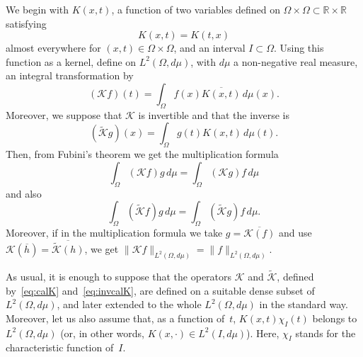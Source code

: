 \documentclass[11pt,a4paper]{amsart}
\theoremstyle{plain}
\theoremstyle{definition}
\newcommand{\R}{\mathbb{R}}
\newcommand{\calK}{\mathcal{K}}
\begin{document}
We begin with $K(x,t)$, a function of two variables defined on $\Omega
\times \Omega \subset \R\times \R$ satisfying
\begin{equation*}
  K(x,t)=K(t,x)
\end{equation*} 
almost everywhere for $(x,t) \in \Omega \times \Omega$, 
and an interval $I\subset \Omega$.
Using this function as a kernel, define on $L^{2}(\Omega,d\mu)$, 
with $d\mu$ a non-negative real measure, an integral
transformation by
\begin{equation}
\label{eq:calK}
  (\calK f)(t) = \int_{\Omega} f(x)\overline{K(x,t)}\,d\mu(x).
\end{equation}
Moreover, we suppose that $\calK$ is invertible and that the inverse is
\begin{equation}
\label{eq:invcalK}
  (\widetilde{\calK}g)(x) = \int_{\Omega} g(t)K(x,t)\,d\mu(t).
\end{equation}
Then, from Fubini's theorem we get the multiplication formula
\begin{equation}
\label{eq:multiplication}
  \int_{\Omega} (\calK f) g\,d\mu = \int_{\Omega} (\calK g)f\,d\mu
\end{equation}
and also
\begin{equation*}
  \int_{\Omega} (\widetilde{\calK} f) g\,d\mu
  = \int_{\Omega} (\widetilde{\calK} g) f\,d\mu.
\end{equation*}
Moreover, if in the multiplication formula we take $g = \overline{\calK(f)}$
and use $\calK(\overline{h}) = \overline{\widetilde{\calK}(h)}$,
we get $\|\calK f\|_{L^2(\Omega,d\mu)} = \|f\|_{L^2(\Omega,d\mu)}$.

As usual, it is enough to suppose that the operators
$\calK$ and $\widetilde{\calK}$,
defined by~\eqref{eq:calK} and~\eqref{eq:invcalK}, are
defined on a suitable dense subset of $L^2(\Omega,d\mu)$, and later
extended to the whole $L^2(\Omega,d\mu)$ in the standard way.
Moreover, let us also assume that, as a function of~$t$,
$K(x,t)\chi_I(t)$ belongs to $L^{2}(\Omega,d\mu)$
(or, in other words, $K(x,\cdot) \in L^{2}(I,d\mu)$).
Here, $\chi_{I}$ stands for the characteristic function of~$I$.
\end{document}
